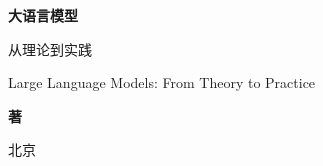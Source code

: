 \thispagestyle{empty}

\vspace*{28mm}

\begin{center}
  {\fontsize{28pt}{34pt}\selectfont\heiti\bfseries 大语言模型\par}
  \vspace{4mm}
  {\fontsize{16pt}{22pt}\selectfont\heiti 从理论到实践\par}
  \vspace{6mm}
  {\fontsize{10.5pt}{14pt}\selectfont\sffamily Large Language Models: From Theory to Practice\par}

  \vspace{30mm}
  {\large\heiti\bfseries \bookauthor\quad 著\par}

  \vfill

  {\normalsize\heiti [ 出版社名称预留 ]\par}
  \vspace{3mm}
  {\small\sffamily 北\quad 京\par}
  \vspace{16mm}
\end{center}

\clearpage
